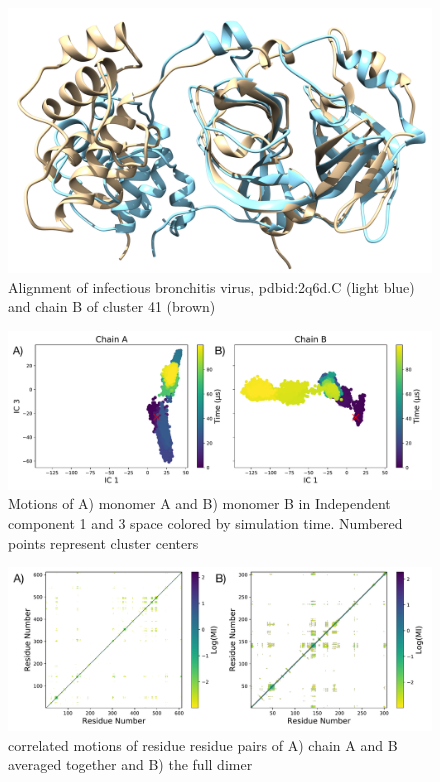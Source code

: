 \documentclass{biophys-new}
\begin{document}
\begin{figure}[h]
\centering
\graphicspath{ {./images/} }
\includegraphics[width=0.6\linewidth]{blue-2Q6D-C-brown-cluster-41-better-align-2.png}
\caption{Alignment of infectious bronchitis virus, pdbid:2q6d.C (light blue) and chain B of cluster 41 (brown)}
\label{fig:view}
\end{figure}

\begin{figure}[h]
\centering
\graphicspath{ {./figures/} }
\includegraphics[width=0.6\linewidth]{fig_4_fdiscolortime_ic3_label.pdf}
\caption{Motions of A) monomer A and B) monomer B in Independent component 1 and 3 space colored by simulation time. Numbered points represent cluster centers}
\label{fig:view}
\end{figure}

\begin{figure}[h]
\centering
\graphicspath{ {./figures/} }
\includegraphics[width=0.6\linewidth]{MI_full_and_average.pdf}
\caption{correlated motions of residue residue pairs of A) chain A and B averaged together and B) the full dimer }
\label{fig:view}
\end{figure}
\end{document}
